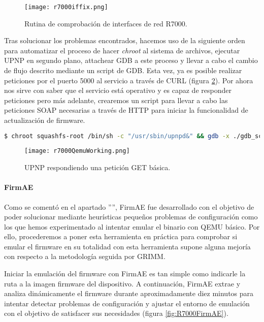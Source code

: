 \begin{figure}[H]
    \centering
    \texttt{[image: r7000iffix.png]}
    \caption{Rutina de comprobación de interfaces de red R7000.}
    \label{fig:R7000iffix}
\end{figure}

Tras solucionar los problemas encontrados, hacemos uso de la siguiente orden para automatizar el proceso de hacer \textit{chroot}
al sistema de archivos, ejecutar UPNP en segundo plano, attachear GDB a este proceso y llevar a cabo el cambio de flujo descrito mediante un script de GDB.
Esta vez, ya es posible realizar peticiones por el puerto 5000 al servicio a través de CURL (figura \ref{fig:R7000QemuWorking}). Por ahora nos sirve 
con saber que el servicio está operativo y es capaz de responder peticiones pero más adelante, crearemos un script para llevar a cabo las peticiones 
SOAP necesarias a través de HTTP para iniciar la funcionalidad de actualización de firmware.

\begin{lstlisting}[language=bash, breaklines]
    $ chroot squashfs-root /bin/sh -c "/usr/sbin/upnpd&" && gdb -x ./gdb_script -q -p `pgrep upnpd`
\end{lstlisting}

\begin{figure}[H]
    \centering
    \texttt{[image: r7000QemuWorking.png]}
    \caption{UPNP respondiendo una petición GET básica.}
    \label{fig:R7000QemuWorking}
\end{figure}

\paragraph{FirmAE}
Como se comentó en el apartado '''', FirmAE fue desarrollado con el objetivo de poder solucionar mediante heurísticas 
pequeños problemas de configuración como los que hemos experimentado al intentar emular el binario con QEMU básico. Por ello, 
procederemos a poner esta herramienta en práctica para comprobar si emular el firmware en su totalidad con esta herramienta supone alguna mejoría con respecto a la metodología seguida
por GRIMM\cite{r7000GRIMM}.

Iniciar la emulación del firmware con FirmAE es tan simple como indicarle la ruta a la imagen firmware del dispositivo. A continuación, 
FirmAE extrae y analiza dinámicamente el firmware durante aproximadamente diez minutos para intentar detectar problemas de configuración y 
ajustar el entorno de emulación con el objetivo de satisfacer sus necesidades (figura \ref{fig:R7000FirmAE}). 

